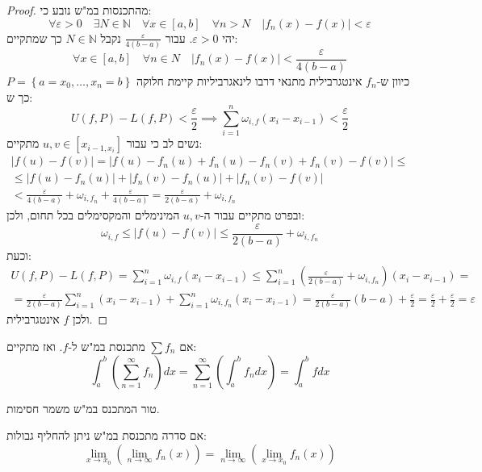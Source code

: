 \documentclass{tstextbook}
\begin{document}
\begin{proof}
מהתכנסות במ"ש נובע כי:
$$\forall\varepsilon>0\quad \exists N \in \mathbb{N} \quad \forall x \in \left[ a,b\right]\quad \forall n> N\quad \lvert f_{n}(x)-f(x) \rvert <\varepsilon$$
יהי \(\varepsilon>0\). עבור \(\frac{\varepsilon}{4(b-a)}\) נקבל \(N \in \mathbb{N}\) כך שמתקיים:
$$\forall x \in [a,b]\quad  \forall n \in N\quad \lvert f_{n}(x)-f(x) \rvert <\frac{\varepsilon}{4(b-a)}$$
כיוון ש-\(f_{n}\) אינטגרבילית מתנאי דרבו לינאגרביליות קיימת חלוקה \(P=\left\{  a=x_{0},\dots,x_{n}=b  \right\}\) כך ש:
$$U(f,P)-L(f,P)<\frac{\varepsilon}{2}\implies\sum_{i=1}^{n} \omega_{i,f}(x_{i}-x_{i-1})<\frac{\varepsilon}{2}$$
נשים לב כי עבור \(u,v \in [x_{i-1,x_{i}}]\) מתקיים:
\begin{gather*}\lvert f(u)-f(v) \rvert =\lvert f(u)-f_{n}(u)+f_{n}(u)-f_{n}(v)+f_{n}(v)-f(v) \rvert \leq \\\leq \lvert f(u)-f_{n}(u) \rvert +\lvert f_{n}(v)-f_{n}(u) \rvert +\lvert f_{n}(v)-f(v) \rvert  \\<\frac{\varepsilon}{4(b-a)}+\omega_{i,f_{n}}+\frac{\varepsilon}{4(b-a)}=\frac{\varepsilon}{2(b-a) }+\omega_{i,f_{n}}
\end{gather*}
ובפרט מתקיים עבור ה-\(u,v\) המינימלים והמקסימלים בכל תחום, ולכן:
$$\omega_{i,f}\leq \lvert f(u)-f(v) \rvert \leq \frac{\varepsilon}{2(b-a)}+\omega_{i,f_{n}}$$
וכעת:
\begin{gather*}U(f,P)-L(f,P)=\sum_{i=1}^{n}\omega_{i,f}(x_{i}-x_{i-1})\leq\sum_{i=1}^{n} \left( \frac{\varepsilon}{2(b-a)}+\omega_{i, f_{n}} \right)(x_{i}-x_{i-1})=  \\=\frac{\varepsilon}{2(b-a)}\sum_{i=1}^{n}(x_{i}-x_{i-1})+\sum_{i=1}^{n} \omega_{i,f_{n}}(x_{i}-x_{i-1})=\frac{\varepsilon}{2(b-a) }(b-a)+\frac{\varepsilon}{2}=\frac{\varepsilon}{2}+\frac{\varepsilon}{2}=\varepsilon 
\end{gather*}
ולכן \(f\) אינטגרבילית.

\end{proof}
\begin{proposition}
אם \(\sum f_n\) מתכנסת במ"ש ל-\(f\). ואז מתקיים:
 $$\int_a^b \left(\sum_{n=1}^\infty f_n\right) dx=\sum_{n=1}^\infty \left(\int_a^b f_n dx\right)=\int_a^b f dx$$

\end{proposition}
\begin{proposition}
טור המתכנס במ"ש משמר חסימות.

\end{proposition}
\begin{proposition}
אם סדרה מתכנסת במ"ש ניתן להחליף גבולות:
$$\operatorname*{lim}_{x\to x_{0}}\left(\operatorname*{lim}_{n\to\infty}f_{n}(x)\right)=\operatorname*{lim}_{n\to\infty}\left(\operatorname*{lim}_{x\to x_{0}}f_{n}(x)\right)$$

\end{proposition}
\end{document}

